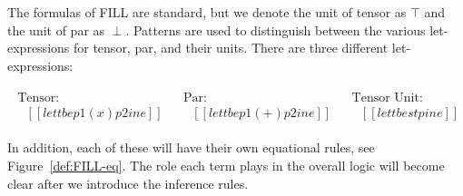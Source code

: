 The formulas of FILL are standard, but we denote the unit of tensor as
$\top$ and the unit of par as $\perp$. Patterns are used to
distinguish between the various let-expressions for tensor, par, and
their units.  There are three different let-expressions:
\begin{center}
  \begin{math}
    \begin{array}{lll}
      \begin{array}{lll}
        \text{Tensor:}\\
        \,\,\,\,[[let t be p1 (x) p2 in e]]
      \end{array}
      &
      \begin{array}{lll}
        \text{Par:}\\
        \,\,\,\,[[let t be p1 (+) p2 in e]]
      \end{array}
      &
      \begin{array}{lll}
        \text{Tensor Unit:}\\
        \,\,\,\,[[let t be stp in e]]
      \end{array}
    \end{array}
  \end{math}
\end{center}
In addition, each of these will have their own equational rules, see
Figure~\ref{def:FILL-eq}.  The role each term plays in the overall
logic will become clear after we introduce the inference rules.

